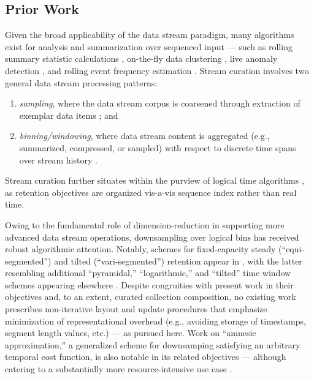 \subsection{Prior Work}
\label{sec:prior-work}

Given the broad applicability of the data stream paradigm, many algorithms exist for analysis and summarization over sequenced input --- such as rolling summary statistic calculations \citep{lin2004continuously}, on-the-fly data clustering \citep{silva2013data}, live anomaly detection \citep{cai2004maids}, and rolling event frequency estimation \citep{manku2002approximate}.
Stream curation involves two general data stream processing patterns:
\begin{enumerate}
\item \textit{sampling}, where the data stream corpus is coarsened through extraction of exemplar data items \citep{sibai2016sampling}; and
\item \textit{binning/windowing}, where data stream content is aggregated (e.g., summarized, compressed, or sampled) with respect to discrete time spans over stream history \citep{gama2007data}.
\end{enumerate}
Stream curation further situates within the purview of logical time algorithms \citep{sibai2016sampling}, as retention objectives are organized vis-a-vis sequence index rather than real time.

Owing to the fundamental role of dimension-reduction in supporting more advanced data stream operations, downsampling over logical bins has received robust algorithmic attention.
Notably, schemes for fixed-capacity steady (``equi-segmented'') and tilted (``vari-segmented'') retention appear in \citep{zhao2005generalized}, with the latter resembling additional ``pyramidal,'' ``logarithmic,'' and ``tilted'' time window schemes appearing elsewhere \citep{aggarwal2003framework,han2005stream,giannella2003mining,phithakkitnukoon2010recent}.
Despite congruities with present work in their objectives and, to an extent, curated collection composition, no existing work prescribes non-iterative layout and update procedures that emphasize minimization of representational overhead (e.g., avoiding storage of timestamps, segment length values, etc.) --- as pursued here.
Work on ``amnesic approximation,'' a generalized scheme for downsamping satisfying an arbitrary temporal cost function, is also notable in its related objectives --- although catering to a substantially more resource-intensive use case \citep{palpanas2004online}.


